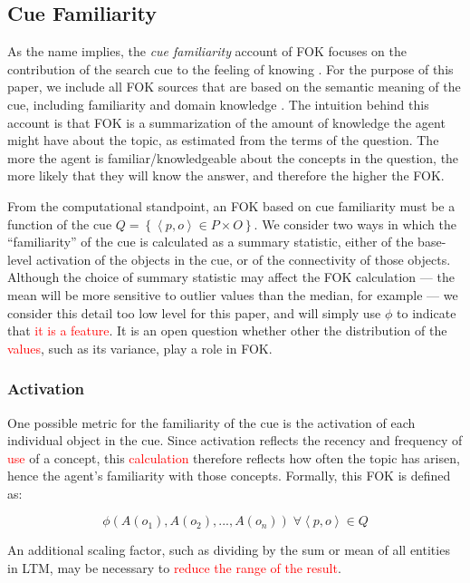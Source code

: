 \documentclass[10pt,letterpaper]{article}
\newcommand{\fixme}[2][]{#2}
\renewcommand{\fixme}[2][]{\textcolor{red}{#2}}
\newcommand{\setof}[1]{\left \{ #1 \right \}}
\newcommand{\tuple}[1]{\left \langle #1 \right \rangle }
\begin{document}
\subsection{Cue Familiarity}

As the name implies, the \emph{cue familiarity} account of FOK focuses on the contribution of the search cue to the feeling of knowing \cite{Reder1992WhatDeterminesInitial,Metcalfe1993TheCueFamiliarity,Koriat2001TheCombinedContributions}.
For the purpose of this paper, we include all FOK sources that are based on the semantic meaning of the cue, including familiarity and domain knowledge \cite{Schwartz1994SourcesOfInformation}.
The intuition behind this account is that FOK is a summarization of the amount of knowledge the agent might have about the topic, as estimated from the terms of the question.
The more the agent is familiar/knowledgeable about the concepts in the question, the more likely that they will know the answer, and therefore the higher the FOK.

From the computational standpoint, an FOK based on cue familiarity must be a function of the cue $Q = \setof{\tuple{p, o}{\in}P{\times}O}$.
We consider two ways in which the ``familiarity'' of the cue is calculated as a summary statistic, either of the base-level activation of the objects in the cue, or of the connectivity of those objects.
Although the choice of summary statistic may affect the FOK calculation --- the mean will be more sensitive to outlier values than the median, for example --- we consider this detail too low level for this paper, and will simply use $\phi$ to indicate that \fixme{it is a feature}.
It is an open question whether other the distribution of the \fixme{values}, such as its variance, play a role in FOK.

\subsubsection{Activation}

One possible metric for the familiarity of the cue is the activation of each individual object in the cue.
Since activation reflects the recency and frequency of \fixme{use} of a concept, this \fixme{calculation} therefore reflects how often the topic has arisen, hence the agent's familiarity with those concepts.
Formally, this FOK is defined as:

$$\phi\left(A(o_1), A(o_2), ..., A(o_n)\right) \; \forall {\tuple{p, o}{\in}Q}$$

An additional scaling factor, such as dividing by the sum or mean of all entities in LTM, may be necessary to \fixme{reduce the range of the result}.
\end{document}

